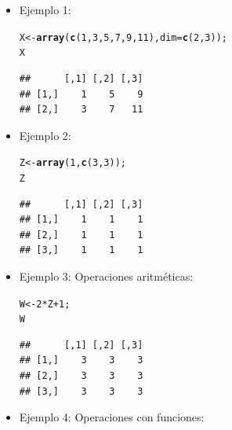 \documentclass[12pt,letterpaper]{article}\usepackage[]{graphicx}\usepackage[]{color}
\makeatletter
\newcommand{\hlnum}[1]{\textcolor[rgb]{0.686,0.059,0.569}{#1}}%
\newcommand{\hlopt}[1]{\textcolor[rgb]{0,0,0}{#1}}%
\newcommand{\hlstd}[1]{\textcolor[rgb]{0.345,0.345,0.345}{#1}}%
\newcommand{\hlkwb}[1]{\textcolor[rgb]{0.69,0.353,0.396}{#1}}%
\newcommand{\hlkwc}[1]{\textcolor[rgb]{0.333,0.667,0.333}{#1}}%
\newcommand{\hlkwd}[1]{\textcolor[rgb]{0.737,0.353,0.396}{\textbf{#1}}}%
\newenvironment{kframe}{%
 \def\at@end@of@kframe{}%
 \ifinner\ifhmode%
  \def\at@end@of@kframe{\end{minipage}}%
  \begin{minipage}{\columnwidth}%
 \fi\fi%
 \def\FrameCommand##1{\hskip\@totalleftmargin \hskip-\fboxsep
 \colorbox{shadecolor}{##1}\hskip-\fboxsep
     \hskip-\linewidth \hskip-\@totalleftmargin \hskip\columnwidth}%
 \MakeFramed {\advance\hsize-\width
   \@totalleftmargin\z@ \linewidth\hsize
   \@setminipage}}%
 {\par\unskip\endMakeFramed%
 \at@end@of@kframe}
\newenvironment{knitrout}{}{} %
\makeatother
\begin{document}
\begin{itemize}
\item Ejemplo 1:
\begin{knitrout}
\color{fgcolor}\begin{kframe}
\begin{alltt}
\hlstd{X} \hlkwb{<-} \hlkwd{array}\hlstd{(}\hlkwd{c}\hlstd{(}\hlnum{1}\hlstd{,} \hlnum{3}\hlstd{,} \hlnum{5}\hlstd{,} \hlnum{7}\hlstd{,} \hlnum{9}\hlstd{,} \hlnum{11}\hlstd{),} \hlkwc{dim}\hlstd{=}\hlkwd{c}\hlstd{(}\hlnum{2}\hlstd{,} \hlnum{3}\hlstd{));}
\hlstd{X}
\end{alltt}
\begin{verbatim}
##      [,1] [,2] [,3]
## [1,]    1    5    9
## [2,]    3    7   11
\end{verbatim}
\end{kframe}
\end{knitrout}
\item Ejemplo 2:
\begin{knitrout}
\color{fgcolor}\begin{kframe}
\begin{alltt}
\hlstd{Z} \hlkwb{<-} \hlkwd{array}\hlstd{(}\hlnum{1}\hlstd{,} \hlkwd{c}\hlstd{(}\hlnum{3}\hlstd{,} \hlnum{3}\hlstd{));}
\hlstd{Z}
\end{alltt}
\begin{verbatim}
##      [,1] [,2] [,3]
## [1,]    1    1    1
## [2,]    1    1    1
## [3,]    1    1    1
\end{verbatim}
\end{kframe}
\end{knitrout}
\item Ejemplo 3: Operaciones aritm\'eticas:
\begin{knitrout}
\color{fgcolor}\begin{kframe}
\begin{alltt}
\hlstd{W} \hlkwb{<-} \hlnum{2}\hlopt{*}\hlstd{Z}\hlopt{+}\hlnum{1}\hlstd{;}
\hlstd{W}
\end{alltt}
\begin{verbatim}
##      [,1] [,2] [,3]
## [1,]    3    3    3
## [2,]    3    3    3
## [3,]    3    3    3
\end{verbatim}
\end{kframe}
\end{knitrout}
\newpage
\item Ejemplo 4: Operaciones con funciones:
\begin{knitrout}

\end{knitrout}
\end{itemize}
\end{document}
